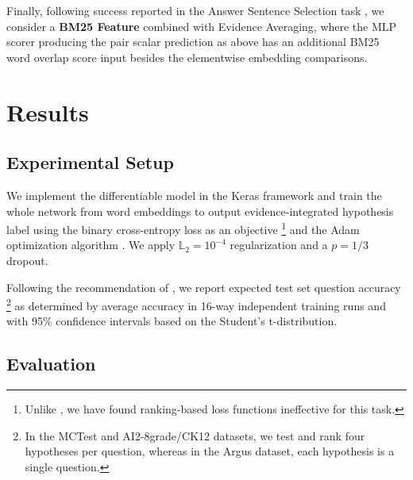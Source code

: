 \documentclass[11pt]{article}
\begin{document}
Finally, following success reported in the Answer Sentence Selection task \cite{sps},
we consider a \textbf{BM25 Feature} combined with Evidence Averaging,
where the MLP scorer producing the pair scalar prediction as above has
an additional BM25 word overlap score input \cite{BM25} besides the elementwise
embedding comparisons.

\section{Results}
\label{sec:res}

\subsection{Experimental Setup}

We implement the differentiable model in the Keras framework \cite{Keras} and
train the whole network from word embeddings to output evidence-integrated
hypothesis label using the binary cross-entropy loss as an objective%
\footnote{Unlike \cite{HABCNN}, we have found ranking-based loss functions
	ineffective for this task.}
and the Adam optimization algorithm \cite{Adam}.  We apply $\mathbb{L}_2 = 10^{-4}$
regularization and a $p=1/3$ dropout.

Following the recommendation of \cite{sps}, we report expected test set
question accuracy%
\footnote{In the MCTest and AI2-8grade/CK12 datasets, we test and rank four
	hypotheses per question, whereas in the Argus dataset, each
	hypothesis is a single question.}
as determined by average accuracy in 16-way independent training runs
and with 95\% confidence intervals based on the Student's
t-distribution.

\subsection{Evaluation}
\end{document}
